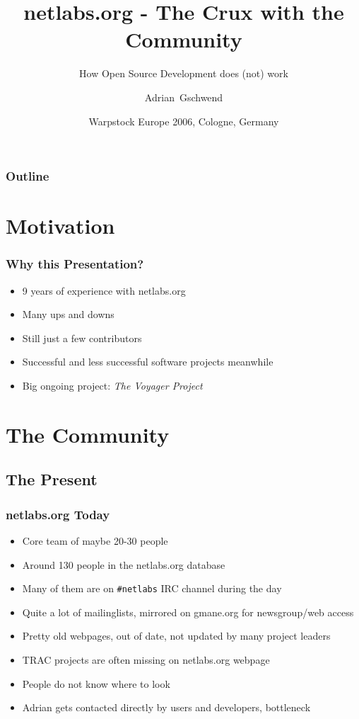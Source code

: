 \documentclass{beamer}
\title[netlabs.org - The Crux with the Community]
{netlabs.org - The Crux with the Community}
\subtitle
{How Open Source Development does (not) work}
\author[Adrian Gschwend]
{Adrian~Gschwend}
\institute[netlabs.org]
{
netlabs.org - Open Source Software for OS/2 and eCS
}
\date[17.11.2006]
{Warpstock Europe 2006, Cologne, Germany}
\begin{document}
\begin{frame}
\titlepage
\end{frame}

\begin{frame}
\frametitle{Outline}
\tableofcontents[hideallsubsections]
\end{frame}

\section{Motivation}

\begin{frame}
\frametitle{Why this Presentation?}
	\begin{itemize}[<+->]
      \item 9 years of experience with netlabs.org
      \item Many ups and downs 
      \item Still just a few contributors
      \item Successful and less successful software projects meanwhile
      \item Big ongoing project: \textit{The Voyager Project}
    \end{itemize}
\end{frame}

\section{The Community}
\subsection{The Present}

\begin{frame}
\frametitle{netlabs.org Today}
\begin{itemize}[<+->]
  \item Core team of maybe 20-30 people
  \item Around 130 people in the netlabs.org database
  \item Many of them are on \texttt{\#netlabs} IRC channel during the day
  \item Quite a lot of mailinglists, mirrored on gmane.org for newsgroup/web
  access 
  \item Pretty old webpages, out of date, not updated by many project leaders
  \item TRAC projects are often missing on netlabs.org webpage
  \item People do not know where to look
  \item Adrian gets contacted directly by users and developers, bottleneck
\end{itemize}
\end{frame}
\end{document}

